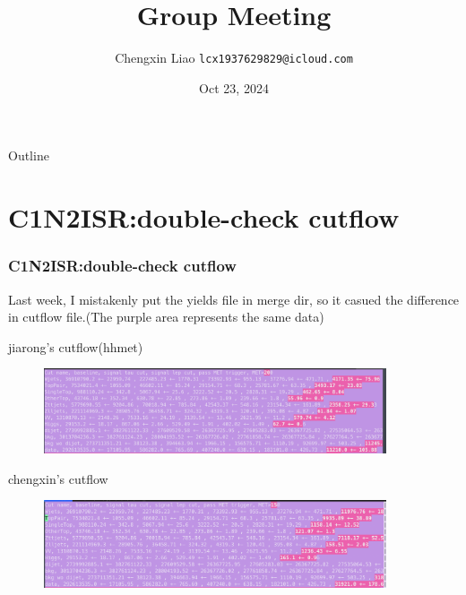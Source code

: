 \documentclass[usenames,dvipsnames]{beamer}
\title[IHEP SUSY Group Meeting]{Group Meeting}
\date[Oct 23, 2024]{Oct 23, 2024}
\author[Chengxin Liao]{
  Chengxin Liao
  \pdfnewline
  \texttt{lcx1937629829@icloud.com}
}
\institute{Department of Physics, Shandong University}
\begin{document}
\begin{frame}
\titlepage
\end{frame}

\begin{frame}{Outline}
\tableofcontents
\end{frame}

\section{C1N2ISR:double-check cutflow}
\begin{frame}
\frametitle{C1N2ISR:double-check cutflow}
Last week, I mistakenly put the yields file in merge dir, so it casued the difference in cutflow file.(The purple area represents the same data)

jiarong's cutflow(hhmet)
\begin{figure}
	\centering
	\includegraphics[width = 0.9\textwidth]{graphics/jiaronghhcutflow}
	\label{jiarong's hh cutflow}
\end{figure}
chengxin's cutflow
\begin{figure}
	\centering
	\includegraphics[width = 0.9\textwidth]{graphics/chengxinhhcutflow}
	\label{chengxin's hh cutflow}
\end{figure}

\end{frame}
\end{document}
